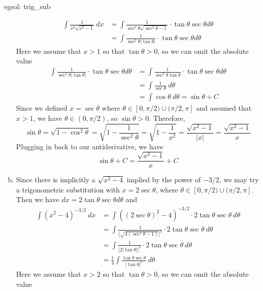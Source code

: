 \begin{egsol}[]{egsol: trig_sub}
\begin{enumerate}[a)]
            \begin{align*}
                \int \frac{1}{x^2\sqrt{x^2-1}}~dx &= \int \frac{1}{\sec^2\theta\sqrt{\sec^2\theta-1}}\cdot\tan \theta \sec\theta d\theta\\
                &= \int \frac{1}{\sec^2\theta|\tan \theta|}\cdot\tan \theta \sec\theta d\theta
            \end{align*}
            Here we assume that $x > 1$ so that $\tan \theta > 0$, so we can omit the absolute value
            \begin{align*}
                \int \frac{1}{\sec^2\theta|\tan \theta|}\cdot\tan \theta \sec\theta d\theta &= \int \frac{1}{\sec^2\theta\tan \theta}\cdot\tan \theta \sec\theta d\theta\\
                &=\int \frac{1}{\sec\theta}~d\theta\\
                &=\int \cos \theta~d\theta = \sin \theta + C
            \end{align*}
            Since we defined $x = \sec \theta$ where $\theta \in [0, \pi/2) \cup (\pi/2, \pi]$ and assumed that $x > 1$, we have $\theta \in (0, \pi/2)$, so $\sin \theta > 0$.  Therefore,
            \[\sin \theta = \sqrt{1-\cos^2\theta} = \sqrt{1-\frac{1}{\sec^2\theta}} = \sqrt{1-\frac{1}{x^2}} = \frac{\sqrt{x^2-1}}{|x|} = \frac{\sqrt{x^2-1}}{x}\]
            Plugging in back to our antiderivative, we have
            \[\sin \theta + C = \frac{\sqrt{x^2-1}}{x} + C\]
            \item Since there is implicitly a $\sqrt{x^2 - 4}$ implied by the power of $-3/2$,  we may try a trigonometric substitution with $x = 2\sec \theta$, where $\theta \in [0,\pi/2)\cup(\pi/2,\pi]$.  Then we have $dx = 2\tan\theta\sec\theta d\theta$ and 
            \begin{align*}
                \int (x^2-4)^{-3/2}~dx &= \int ((2\sec\theta)^2-4)^{-3/2}\cdot 2 \tan \theta \sec \theta~d\theta\\
                &= \int \frac{1}{\big[\sqrt{4(\sec^2\theta-1)}\big]^3}\cdot 2 \tan \theta \sec \theta~d\theta\\
                &= \int \frac{1}{\big[2|\tan\theta|\big]^3}\cdot 2 \tan \theta \sec \theta~d\theta\\
                &= \frac{1}{4} \int \frac{\tan \theta \sec \theta}{|\tan \theta|^3}~d\theta
            \end{align*}
            Here we assume that $x > 2$ so that $\tan \theta > 0$, so we can omit the absolute value
            \begin{align*}

\end{align*}
\end{enumerate}
\end{egsol}
